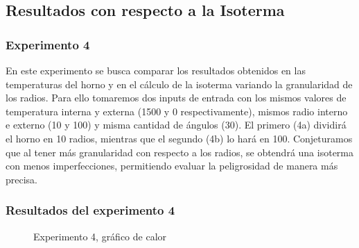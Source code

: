 \subsection{Resultados con respecto a la Isoterma}

\subsubsection{Experimento 4}
\par En este experimento se busca comparar los resultados obtenidos en las temperaturas del horno y en el cálculo de la isoterma variando la granularidad de los radios. Para ello tomaremos dos inputs de entrada con los mismos valores de temperatura interna y externa (1500 y 0 respectivamente), mismos radio interno e externo (10 y 100) y misma cantidad de ángulos (30). El primero (4a) dividirá el horno en 10 radios, mientras que el segundo (4b) lo hará en 100. Conjeturamos que al tener más granularidad con respecto a los radios, se obtendrá una isoterma con menos imperfecciones, permitiendo evaluar la peligrosidad de manera más precisa.
\FloatBarrier

\subsubsection{Resultados del experimento 4}

\begin{figure}[ht]
\begin{center}
\caption{Experimento 4, gráfico de calor}
\end{center}
\end{figure}

